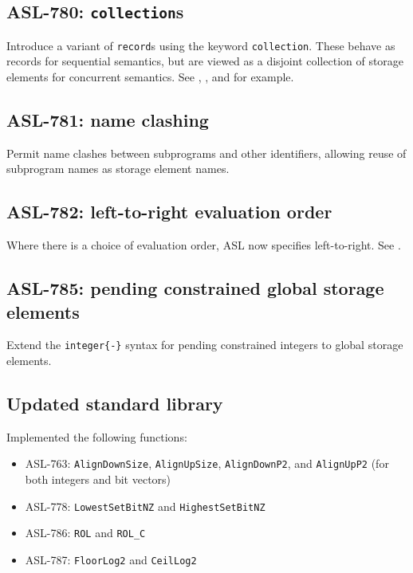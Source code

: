 \subsection{ASL-780: \texttt{collection}s}
Introduce a variant of \texttt{record}s using the keyword \texttt{collection}.
These behave as records for sequential semantics, but are viewed as a disjoint collection of storage elements for concurrent semantics.
See , , and  for example.

\subsection{ASL-781: name clashing}
Permit name clashes between subprograms and other identifiers, allowing reuse of subprogram names as storage element names.

\subsection{ASL-782: left-to-right evaluation order}
Where there is a choice of evaluation order, ASL now specifies left-to-right.
See .

\subsection{ASL-785: pending constrained global storage elements}
Extend the \texttt{integer\{-\}} syntax for pending constrained integers to global storage elements.

\subsection{Updated standard library}
Implemented the following functions:
\begin{itemize}
  \item ASL-763: \texttt{AlignDownSize}, \texttt{AlignUpSize}, \texttt{AlignDownP2}, and \texttt{AlignUpP2} (for both integers and bit vectors)
  \item ASL-778: \texttt{LowestSetBitNZ} and \texttt{HighestSetBitNZ}
  \item ASL-786: \texttt{ROL} and \texttt{ROL\_C}
  \item ASL-787: \texttt{FloorLog2} and \texttt{CeilLog2}
\end{itemize}

